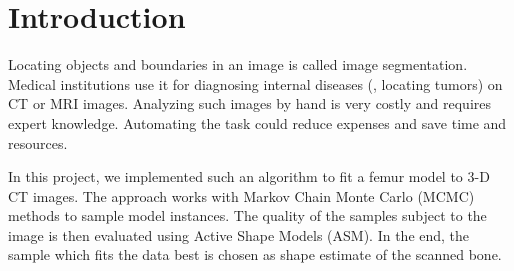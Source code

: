 \section{Introduction}
\label{sec:intro}

Locating objects and boundaries in an image is called image segmentation.
Medical institutions use it for diagnosing internal diseases (\eg, locating tumors) on CT or MRI images.
Analyzing such images by hand is very costly and requires expert knowledge.
Automating the task could reduce expenses and save time and resources.

In this project, we implemented such an algorithm to fit a femur model to 3-D CT images.
The approach works with Markov Chain Monte Carlo (MCMC) methods to sample model instances.
The quality of the samples subject to the image is then evaluated using Active Shape Models (ASM).
In the end, the sample which fits the data best is chosen as shape estimate of the scanned bone.
